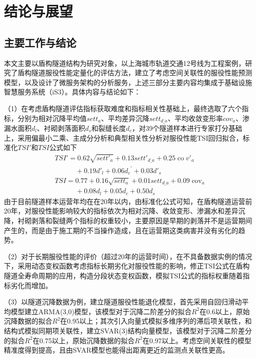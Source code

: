 \chapter{结论与展望}

\section{主要工作与结论}

本文主要以盾构隧道结构为研究对象，以上海城市轨道交通12号线为工程案例，研究了盾构隧道服役性能定量化的评估方法，建立了考虑空间关联性的服役性能预测模型，以及设计了微服务架构的分析服务，上述三部分主要内容均集成于基础设施智慧服务系统（iS3）。具体内容与结论如下：

（1）在考虑盾构隧道评估指标获取难度和指标相关性基础上，最终选取了六个指标，分别为相对沉降平均值${sett}_{a}$、平均差异沉降$set{{t}_{d\_a}}$、平均收敛变形率${cov}_{a}$、渗漏水面积${d}_{l}$、衬砌剥落面积${d}_{s}$和裂缝长度${d}_{c}$，对39个隧道样本进行专家打分基础上，采用偏最小二乘、主成分分析和典型相关性分析对服役性能TSI回归拟合，标准化$TSI'$和$TSI$公式如下
\begin{align}
  & TS{I}'=0.62\sqrt{set{{{{t}'}}_{a}}}+0.13set{{{{t}'}}_{d\_a}}+0.25\operatorname{co}{{{{v}'}}_{a}} \nonumber \\ 
 & \quad \quad \quad +0.19{{{{d}'}}_{l}}+0.06{{d}_{c}}^{\prime }+0.03{{{{d}'}}_{s}} \nonumber \\
  & TSI=0.77+0.16\sqrt{set{{t}_{a}}}+0.01set{{t}_{d\_a}}+0.09{{\operatorname{cov}}_{a}} \nonumber \\ 
 & \quad \quad \quad +0.08{{d}_{l}}+0.05{{d}_{c}}+0.50{{d}_{s}} \nonumber 
\end{align}
由于目前隧道样本运营年均在在20年以内，由标准化公式可知，在盾构隧道运营前20年，对服役性能影响较大的指标依次为相对沉降、收敛变形、渗漏水和差异沉降，衬砌剥落和裂缝两个指标的权重较小，主要原因是早期的剥落并不是运营期间产生的，而是由于施工期的不当操作造成，且在运营期这类病害并没有劣化的趋势。

（2）对于长期服役性能的评价（超过20年的运营时间），在不具备数据实例的情况下，采用动态变权函数考虑指标长期劣化对服役性能的影响，修正TSI公式在盾构隧道全寿命周期的应用，构造分段状态变权函数，模拟TSI公式的指标权重随着指标劣化而增加。

（3）以隧道沉降数据为例，建立隧道服役性能退化模型，首先采用自回归滑动平均模型建立ARMA(3,0)模型，该模型对于沉降二阶差分的拟合$R^2$在0.6以上，原始沉降数据的拟合$R^2$在0.95以上；其次引入向量式模拟多维序列的滞后项关联性，和结构式模拟同期项关联性，建立SVAR(3)结构向量模型，该模型对于沉降二阶差分的拟合$R^2$在0.75以上，原始沉降数据的拟合$R^2$在0.97以上。考虑空间关联性的模型精准度得到提高，且由SVAR模型也能得出距离更近的监测点关联性更高。

